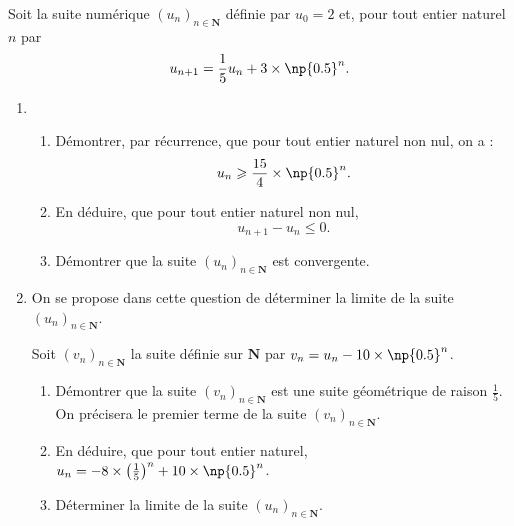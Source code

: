 \documentclass[a4paper,12pt,french]{article}
\newcommand{\N}{\mathbf{N}}
\begin{document}
\begin{Exercise}[number=3]
  Soit la suite numérique $(u_n)_{n\in\N}$ définie par $u_0 = 2$ et,
  pour tout entier naturel $n$ par \[ u_{n+1} = \frac15u_n + 3 \times
  \np{0.5}^n. \]
  \begin{enumerate}
    \item \begin{enumerate}
        \item Démontrer, par récurrence, que pour tout entier naturel
          non nul, on a : \[ u_n \geqslant \frac{15}4 \times
          \np{0.5}^n.\]
        \item En déduire, que pour tout entier naturel non nul, \[
          u_{n+1} - u_n \leqslant 0.\]
        \item Démontrer que la suite $(u_n)_{n\in\N}$ est convergente.
      \end{enumerate}
    \item On se propose dans cette question de déterminer la limite de
      la suite $(u_n)_{n\in\N}$.

      Soit $(v_n)_{n\in\N}$ la suite définie sur $\N$ par $v_n = u_n -
      10\times \np{0.5}^n$.
      \begin{enumerate}
        \item Démontrer que la suite $(v_n)_{n\in\N}$ est une suite
          géométrique de raison $\frac15$. On précisera le premier terme
          de la suite $(v_n)_{n\in\N}$.
        \item En déduire, que pour tout entier naturel, $u_n = -8 \times
          \left(\frac15\right)^n + 10\times \np{0.5}^n$.
        \item Déterminer la limite de la suite $(u_n)_{n\in\N}$.
      \end{enumerate}
  \end{enumerate}
\end{Exercise}
\end{document}
